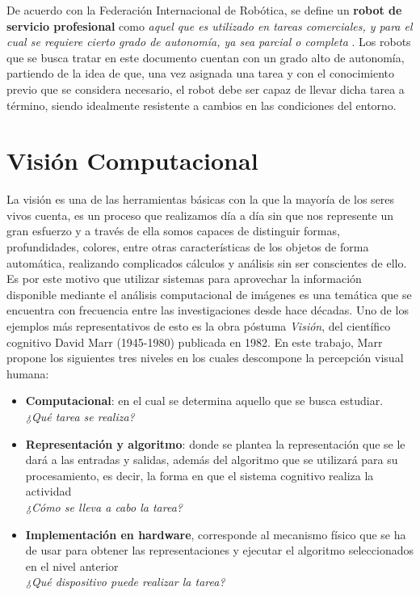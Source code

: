De acuerdo con la Federación Internacional de Robótica, se define un \textbf{robot de servicio profesional} como \textit{aquel que es utilizado en tareas comerciales, y para el cual se requiere cierto grado de autonomía, ya sea parcial o completa} \cite{ifr_international}. Los robots que se busca tratar en este documento cuentan con un grado alto de autonomía, partiendo de la idea de que, una vez asignada una tarea y con el conocimiento previo que se considera necesario, el robot debe ser capaz de llevar dicha tarea a término, siendo idealmente resistente a cambios en las condiciones del entorno.
  
\section{Visión Computacional}
La visión es una de las herramientas básicas con la que la mayoría de los seres vivos cuenta, es un proceso que realizamos día a día sin que nos represente un gran esfuerzo y a través de ella somos capaces de distinguir formas, profundidades, colores, entre otras características de los objetos de forma automática, realizando complicados cálculos y análisis sin ser conscientes de ello. Es por este motivo que utilizar sistemas para aprovechar la información disponible mediante el análisis computacional de imágenes es una temática que se encuentra con frecuencia entre las investigaciones desde hace décadas. Uno de los ejemplos más representativos de esto es la obra póstuma \textit{Visión}, del científico cognitivo David Marr (1945-1980) publicada en 1982. En este trabajo, Marr propone los siguientes tres niveles en los cuales descompone la percepción visual humana:

\begin{itemize} 
    \item \textbf{Computacional}: en el cual se determina aquello que se busca estudiar.\\
    \textit{¿Qué tarea se realiza?}
    \item \textbf{Representación y algoritmo}: donde se plantea la representación que se le dará a las entradas y salidas, además del algoritmo que se utilizará para su procesamiento, es decir, la forma en que el sistema cognitivo realiza la actividad \\
    \textit{¿Cómo se lleva a cabo la tarea?}
    \item \textbf{Implementación en hardware}, corresponde al mecanismo físico que se ha de usar para obtener las representaciones y ejecutar el algoritmo seleccionados en el nivel anterior \\
    \textit{¿Qué dispositivo puede realizar la tarea?}\cite{freire_importancia_2007}
\end{itemize}

